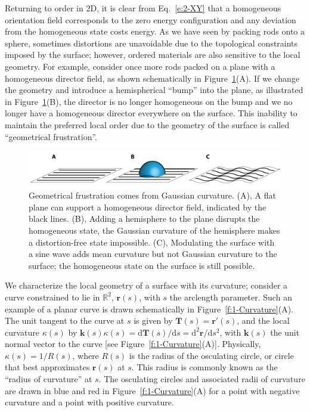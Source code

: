 Returning to order in 2D, it is clear from Eq.~\ref{e:2-XY} that a homogeneous orientation field corresponds to the zero energy configuration and any deviation from the homogeneous state costs energy.
As we have seen by packing rods onto a sphere, sometimes distortions are unavoidable due to the topological constraints imposed by the surface; however, ordered materials are also sensitive to the local geometry.
For example, consider once more rods packed on a plane with a homogeneous director field, as shown schematically in Figure~\ref{f:1-ParallelTransport}(A).
If we change the geometry and introduce a hemispherical ``bump'' into the plane, as illustrated in Figure~\ref{f:1-ParallelTransport}(B), the director is no longer homogeneous on the bump and we no longer have a homogeneous director everywhere on the surface.
This inability to maintain the preferred local order due to the geometry of the surface is called ``geometrical frustration''.
\begin{figure}
  \centering
  \includegraphics{figures/C1/Ch1-Figs_ParallelTransport.png}
  \caption{Geometrical frustration comes from Gaussian curvature.
  (A), A flat plane can support a homogeneous director field, indicated by the black lines.
  (B), Adding a hemisphere to the plane disrupts the homogeneous state, the Gaussian curvature of the hemisphere makes a distortion-free state impossible.
  (C), Modulating the surface with a sine wave adds mean curvature but not Gaussian curvature to the surface; the homogeneous state on the surface is still possible.}\label{f:1-ParallelTransport}
\end{figure}

We characterize the local geometry of a surface with its curvature; consider a curve constrained to lie in $\mathbb{R}^2$, $\mathbf{r}(s)$, with $s$ the arclength parameter.
Such an example of a planar curve is drawn schematically in Figure~\ref{f:1-Curvature}(A).
The unit tangent to the curve at $s$ is given by $\mathbf{T}(s) = \mathbf{r}'(s)$, and the local curvature $\kappa(s)$ by $\mathbf{k}(s)\kappa(s) = \textrm{d} \mathbf{T}(s)/\textrm{d}s = \textrm{d}^2\mathbf{r}/\textrm{d}s^2 $, with $\mathbf{k}(s)$ the unit normal vector to the curve [see Figure~\ref{f:1-Curvature}(A)].
Physically, $\kappa(s) = 1/R(s)$, where $R(s)$ is the radius of the osculating circle, or circle that best approximates $\mathbf{r}(s)$ at $s$.
This radius is commonly known as the ``radius of curvature'' at $s$.
The osculating circles and associated radii of curvature are drawn in blue and red in Figure~\ref{f:1-Curvature}(A) for a point with negative curvature and a point with positive curvature.

